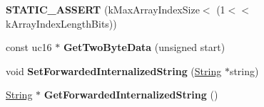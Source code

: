 \begin{DoxyCompactItemize}
\item 
\hypertarget{classv8_1_1internal_1_1_string_af976812addc047f93ea4ae9ff1bd6ec4}{}{\bfseries S\+T\+A\+T\+I\+C\+\_\+\+A\+S\+S\+E\+R\+T} (k\+Max\+Array\+Index\+Size$<$ (1$<$$<$ k\+Array\+Index\+Length\+Bits))\label{classv8_1_1internal_1_1_string_af976812addc047f93ea4ae9ff1bd6ec4}

\item 
\hypertarget{classv8_1_1internal_1_1_string_a12c3771404ad73cbc9316a81f1d6aa98}{}const uc16 $\ast$ {\bfseries Get\+Two\+Byte\+Data} (unsigned start)\label{classv8_1_1internal_1_1_string_a12c3771404ad73cbc9316a81f1d6aa98}

\item 
\hypertarget{classv8_1_1internal_1_1_string_a3e2271a5799a0bcb1ae6291124118e1f}{}void {\bfseries Set\+Forwarded\+Internalized\+String} (\hyperlink{classv8_1_1internal_1_1_string}{String} $\ast$string)\label{classv8_1_1internal_1_1_string_a3e2271a5799a0bcb1ae6291124118e1f}

\item 
\hypertarget{classv8_1_1internal_1_1_string_a6573d166e31907f596e44e25860bcb0a}{}\hyperlink{classv8_1_1internal_1_1_string}{String} $\ast$ {\bfseries Get\+Forwarded\+Internalized\+String} ()\label{classv8_1_1internal_1_1_string_a6573d166e31907f596e44e25860bcb0a}

\end{DoxyCompactItemize}
